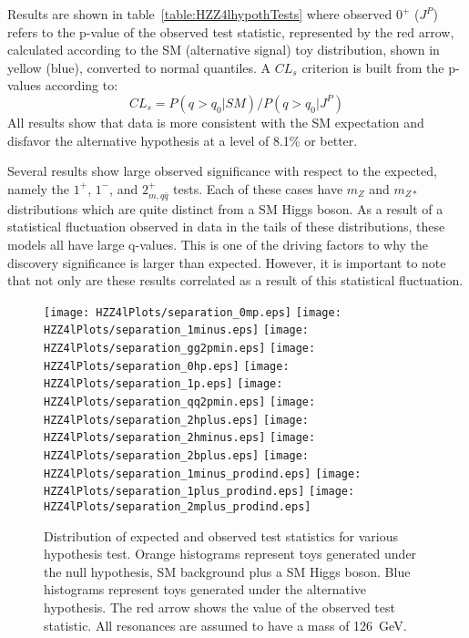 Results are shown in 
table~\ref{table:HZZ4lhypothTests} where observed $0^+$ ($J^P$) 
refers to the p-value 
of the observed test statistic, represented by the red arrow,
calculated according to the SM (alternative signal) toy 
distribution, shown in yellow (blue), converted to normal 
quantiles.  A $CL_s$ criterion is built from the p-values 
according to:
\begin{equation}
CL_s = P(q>q_0|SM)/P(q>q_0|J^P)
\end{equation}  
All results show that data is more consistent with 
the SM expectation and disfavor the alternative hypothesis
at a level of 8.1\% or better.  

Several results show large observed significance with respect to 
the expected, namely the $1^+$, $1^-$, and $2_{m,q\bar{q}}^+$ tests.
Each of these cases have $m_{Z}$ and $m_{Z*}$ distributions which 
are quite distinct from a SM Higgs boson.  As a result of a 
statistical
fluctuation observed in data in the tails of these distributions,
these models all have large q-values.  This is one of the driving
factors to why the discovery significance is larger than expected.
However, it is important
to note that not only are these results correlated as a result
of this statistical fluctuation.

\begin{figure}
\begin{center}
\texttt{[image: HZZ4lPlots/separation\_0mp.eps]}
\texttt{[image: HZZ4lPlots/separation\_1minus.eps]}
\texttt{[image: HZZ4lPlots/separation\_gg2pmin.eps]}
\texttt{[image: HZZ4lPlots/separation\_0hp.eps]}
\texttt{[image: HZZ4lPlots/separation\_1p.eps]}
\texttt{[image: HZZ4lPlots/separation\_qq2pmin.eps]}
\texttt{[image: HZZ4lPlots/separation\_2hplus.eps]}
\texttt{[image: HZZ4lPlots/separation\_2hminus.eps]}
\texttt{[image: HZZ4lPlots/separation\_2bplus.eps]}
\texttt{[image: HZZ4lPlots/separation\_1minus\_prodind.eps]}
\texttt{[image: HZZ4lPlots/separation\_1plus\_prodind.eps]}
\texttt{[image: HZZ4lPlots/separation\_2mplus\_prodind.eps]}
\caption{Distribution of expected and observed test statistics 
for various hypothesis test.  Orange histograms represent toys
generated under the null hypothesis, SM background plus a SM 
Higgs boson.  Blue histograms represent toys generated under the
alternative hypothesis.  The red arrow shows the value of the 
observed test statistic.  All resonances are assumed to have a 
mass of 126~GeV.}
\label{fig:HZZ4lhypothTests}
\end{center}
\end{figure}

